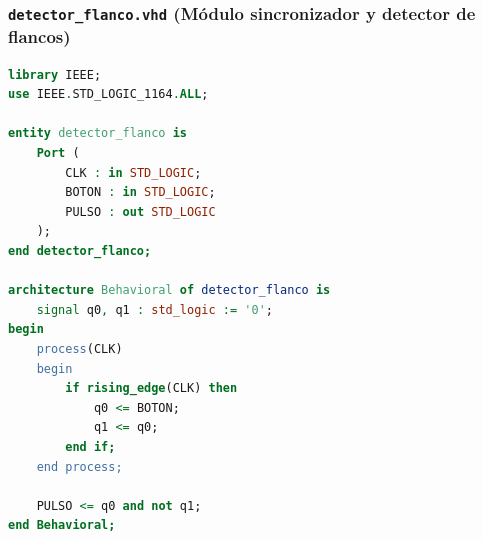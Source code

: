 \documentclass[letterpaper,12pt]{article}
\begin{document}
\subsubsection{\texttt{detector\_flanco.vhd} (Módulo sincronizador y detector de flancos)}
\begin{lstlisting}[language=VHDL, caption={detector\_flanco.vhd}]
library IEEE;
use IEEE.STD_LOGIC_1164.ALL;

entity detector_flanco is
    Port (
        CLK : in STD_LOGIC;
        BOTON : in STD_LOGIC;
        PULSO : out STD_LOGIC
    );
end detector_flanco;

architecture Behavioral of detector_flanco is
    signal q0, q1 : std_logic := '0';
begin
    process(CLK)
    begin
        if rising_edge(CLK) then
            q0 <= BOTON;
            q1 <= q0;
        end if;
    end process;
    
    PULSO <= q0 and not q1;
end Behavioral;
\end{lstlisting}
\end{document}
